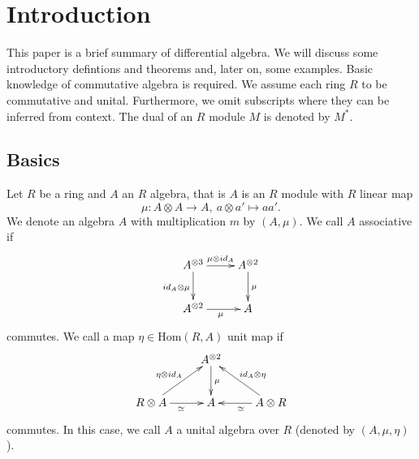 \section{Introduction}
This paper is a brief summary of differential algebra. We will discuss some introductory defintions and theorems and, later on, some examples. Basic knowledge of commutative algebra is required. We assume each ring $R$ to be commutative and unital. Furthermore, we omit subscripts where they can be inferred from context. The dual of an $R$ module $M$ is denoted by $M^*$.
\subsection{Basics}
Let $R$ be a ring and $A$ an $R$ algebra, that is $A$ is an $R$ module with $R$ linear map
$$\mu : A \otimes A \longrightarrow A,\ a \otimes a' \longmapsto a a'.$$
We denote an algebra $A$ with multiplication $m$ by $(A, \mu)$. We call $A$ associative if
$$\xymatrix{
A^{\otimes 3} \ar[r]^{\mu \otimes id_A} \ar[d]_{id_A \otimes \mu} & A^{\otimes 2}\ar[d]^{\mu}\\
A^{\otimes 2} \ar[r]_{\mu} &A\\
}$$
commutes. We call a map $\eta \in \mathrm{Hom}(R,A)$ unit map if
$$\xymatrix{
&A^{\otimes 2}\ar[d]^\mu&\\
R \otimes A \ar[r]_{\simeq}\ar[ru]^{\eta \otimes id_A} &A&A \otimes R \ar[lu]_{id_A \otimes \eta}\ar[l]^\simeq\\
}$$
commutes. In this case, we call $A$ a unital algebra over $R$ (denoted by $(A, \mu, \eta)$).
